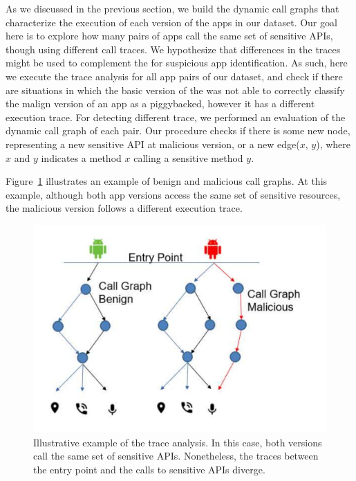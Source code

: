 As we discussed in the previous section, we build the dynamic call graphs that characterize the execution of each version of the apps in our dataset. Our goal
here is to explore how many pairs of apps call the same set of sensitive APIs, though using different call
traces. We hypothesize that differences in the traces might be used to complement the \mas for suspicious app identification. As such, here we execute the trace analysis for all app pairs of our dataset, and check if there are situations in which the basic version of the \mas was not able to correctly classify the malign version of an app as a piggybacked, however it has a different execution trace. For detecting different trace, we performed an evaluation of the dynamic call graph of each pair. Our procedure checks if there is some new node, representing a new sensitive API at malicious version, or a new edge($x$, $y$), where $x$ and $y$ indicates a method $x$ calling a sensitive method $y$.

Figure~\ref{fig:callGraph} illustrates an example of benign and malicious call graphs.
At this example, although both app versions access the same set of sensitive resources, the
malicious version follows a different execution trace. 


\begin{figure}[ht]
\centering
\includegraphics[scale=0.30]{images/maliciousCallGraph.pdf}
\caption{Illustrative example of the trace analysis. In this case, both versions call the same set of sensitive APIs. Nonetheless,
the traces between the entry point and the calls to sensitive APIs diverge.}
 \label{fig:callGraph}
\end{figure}



